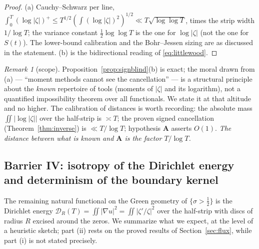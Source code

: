 \documentclass[11pt]{amsart}
\theoremstyle{plain}
\theoremstyle{definition}
\theoremstyle{remark}
\newtheorem{remark}[theorem]{Remark}
\newcommand{\Aax}{\mathbf{A}}
\begin{document}
\begin{proof}
(a) Cauchy--Schwarz per line, $\int_0^T(\log|\zeta|)^+\le T^{1/2}(\int(\log|\zeta|)^2)^{1/2}\ll T\sqrt{\log\log T}$, times the strip width $1/\log T$; the variance constant $\tfrac12\log\log T$ is the one for $\log|\zeta|$ (not the one for $S(t)$). The lower-bound calibration and the Bohr--Jessen sizing are as discussed in the statement. (b) is the bidirectional reading of \eqref{eq:littlewood}.
\end{proof}

\begin{remark}[scope]
Proposition~\ref{prop:signblind}(b) is exact; the moral drawn from (a) --- ``moment methods cannot see the cancellation'' --- is a structural principle about the \emph{known} repertoire of tools (moments of $|\zeta|$ and its logarithm), not a quantified impossibility theorem over all functionals. We state it at that altitude and no higher. The calibration of distances is worth recording: the absolute mass $\iint|\log|\zeta||$ over the half-strip is $\asymp T$; the proven signed cancellation (Theorem~\ref{thm:inverse}) is $\ll T/\log T$; hypothesis $\Aax$ asserts $O(1)$. \emph{The distance between what is known and $\Aax$ is the factor $T/\log T$.}
\end{remark}

\subsection{Barrier IV: isotropy of the Dirichlet energy and determinism of the boundary kernel}

The remaining natural functional on the Green geometry of $\{\sigma>\tfrac12\}$ is the Dirichlet energy $\mathcal D_R(T)=\iint|\nabla u|^2=\iint|\zeta'/\zeta|^2$ over the half-strip with discs of radius $R$ excised around the zeros. We summarize what we expect, at the level of a heuristic sketch; part (ii) rests on the proved results of Section~\ref{sec:flux}, while part (i) is not stated precisely.
\end{document}
